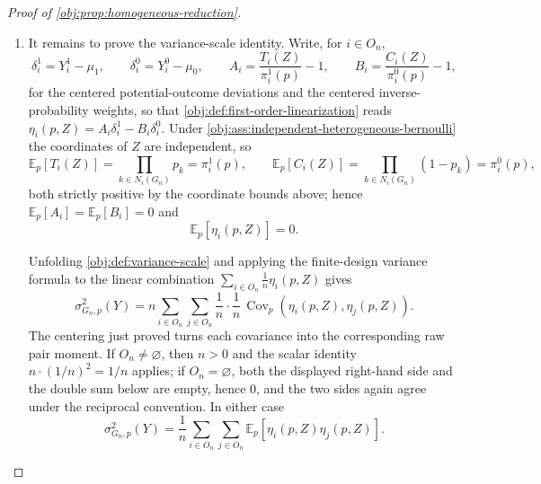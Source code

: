 \documentclass[11pt]{article}
\begin{document}
\begin{proof}[Proof of \cref{obj:prop:homogeneous-reduction}]
\begin{enumerate}
\item It remains to prove the variance-scale identity. Write, for \(i\in O_n\),
\[
\delta_i^1=Y_i^1-\mu_1,\qquad \delta_i^0=Y_i^0-\mu_0,
\qquad
A_i=\frac{T_i(Z)}{\pi_i^1(p)}-1,
\qquad
B_i=\frac{C_i(Z)}{\pi_i^0(p)}-1,
\]
for the centered potential-outcome deviations and the centered inverse-probability weights, so that \cref{obj:def:first-order-linearization} reads \(\eta_i(p,Z)=A_i\delta_i^1-B_i\delta_i^0\). Under \cref{obj:ass:independent-heterogeneous-bernoulli} the coordinates of \(Z\) are independent, so
\[
\mathbb E_p\!\left[T_i(Z)\right]=\prod_{k\in N_i(G_n)}p_k=\pi_i^1(p),
\qquad
\mathbb E_p\!\left[C_i(Z)\right]=\prod_{k\in N_i(G_n)}(1-p_k)=\pi_i^0(p),
\]
both strictly positive by the coordinate bounds above; hence \(\mathbb E_p[A_i]=\mathbb E_p[B_i]=0\) and
\[
\mathbb E_p\!\left[\eta_i(p,Z)\right]=0 .
\]

Unfolding \cref{obj:def:variance-scale} and applying the finite-design variance formula to the linear combination \(\sum_{i\in O_n}\frac1n\eta_i(p,Z)\) gives
\[
\sigma_{G_n,p}^2(Y)
= n\sum_{i\in O_n}\sum_{j\in O_n}
 \frac1n\cdot\frac1n\,
 \operatorname{Cov}_p\!\left(\eta_i(p,Z),\eta_j(p,Z)\right).
\]
The centering just proved turns each covariance into the corresponding raw pair moment. If \(O_n\neq\varnothing\), then \(n>0\) and the scalar identity \(n\cdot(1/n)^2=1/n\) applies; if \(O_n=\varnothing\), both the displayed right-hand side and the double sum below are empty, hence \(0\), and the two sides again agree under the reciprocal convention. In either case
\[
\sigma_{G_n,p}^2(Y)
=\frac1n\sum_{i\in O_n}\sum_{j\in O_n}
\mathbb E_p\!\left[\eta_i(p,Z)\eta_j(p,Z)\right].
\]


\end{enumerate}
\end{proof}
\end{document}
